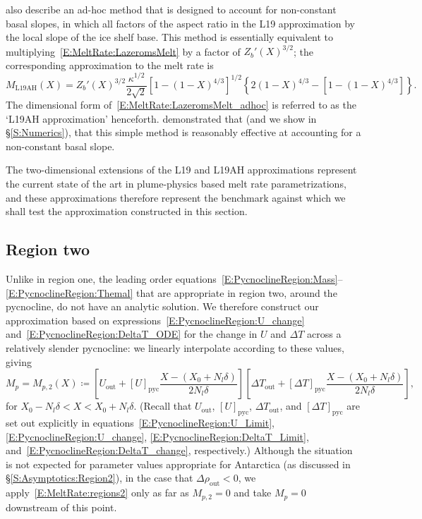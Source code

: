 \documentclass[openacc]{rsproca_new}%
\newcommand{\lt}{\delta} %
\newcommand{\out}{\text{out}}
\begin{document}
\citet{Lazeroms2019JPhysOcean} also describe an ad-hoc method that is designed to account for non-constant basal slopes, in which all factors of the aspect ratio in the L19 approximation by the local slope of the ice shelf base. This method is essentially equivalent to multiplying~\eqref{E:MeltRate:LazeromsMelt} by a factor of $Z_b'(X)^{3/2}$; the corresponding approximation to the melt rate is
\begin{equation}\label{E:MeltRate:LazeromsMelt_adhoc}
M_{\text{L19AH}}(X) =Z_b'(X)^{3/2} \frac{\kappa^{1/2}}{2\sqrt{2}}\left[1 - (1 - X)^{4/3}\right]^{1/2}\left\{2(1-X)^{4/3} - \left[1- (1 - X)^{4/3}\right]\right\}.
\end{equation}
The dimensional form of~\eqref{E:MeltRate:LazeromsMelt_adhoc} is referred to as the `L19AH approximation' henceforth. \citet{Lazeroms2019JPhysOcean} demonstrated that (and we show in \S\ref{S:Numerics}), that this simple method is reasonably effective at accounting for a non-constant basal slope.

The two-dimensional extensions of the L19 and L19AH approximations represent the current state of the art in plume-physics based melt rate parametrizations, and these approximations therefore represent the benchmark against which we shall test the approximation constructed in this section.

\subsection{Region two}
Unlike in region one, the leading order equations~\eqref{E:PycnoclineRegion:Mass}--\eqref{E:PycnoclineRegion:Themal} that are appropriate in region two, around the pycnocline, do not have an analytic solution. We therefore construct our approximation based on expressions~\eqref{E:PycnoclineRegion:U_change} and~\eqref{E:PycnoclineRegion:DeltaT_ODE} for the change in $U$ and $\Delta T$ across a relatively slender pycnocline: we linearly interpolate according to these values, giving
\begin{equation}\label{E:MeltRate:regions2}
M_{p} = M_{p,2}(X) \coloneqq \left[U_{\out} + \left[U\right]_{\text{pyc}} \frac{X - (X_0 + N_l \lt)}{2N_l \lt}\right]  \left[\Delta T_{\out} +  \left[\Delta T\right]_{\text{pyc}} \frac{X - (X_0 + N_l \lt)}{2N_l \lt}\right] , 
\end{equation}
for $ X_0 - N_l \lt  < X < X_0 + N_l \lt$. (Recall that $U_\out$, $\left[U\right]_{\text{pyc}}$, $\Delta T_\out$, and $\left[\Delta T\right]_{\text{pyc}}$ are set out explicitly in equations~\eqref{E:PycnoclineRegion:U_Limit}, \eqref{E:PycnoclineRegion:U_change}, \eqref{E:PycnoclineRegion:DeltaT_Limit}, and~\eqref{E:PycnoclineRegion:DeltaT_change}, respectively.) Although the situation is not expected for parameter values appropriate for Antarctica (as discussed in \S\ref{S:Asymptotics:Region2}), in the case that $\Delta \rho_\out < 0$, we apply~\eqref{E:MeltRate:regions2} only as far as $M_{p,2} = 0$ and take $M_{p} = 0$ downstream of this point.
\end{document}
